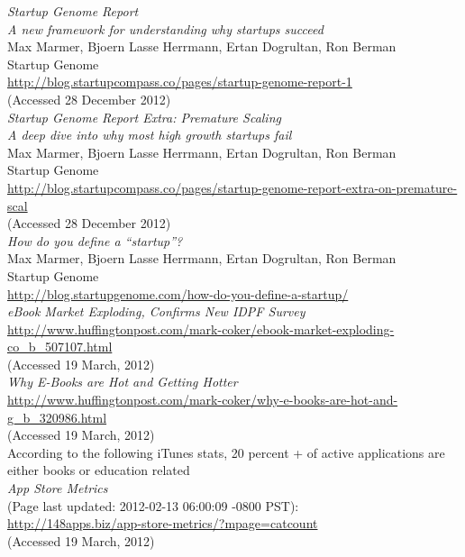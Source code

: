 \documentclass[a4paper,10pt]{article}
\begin{document}
\begin{thebibliography}{9}
  
 
 
  \emph{Startup Genome Report\\
	A new framework for understanding why startups succeed}\\
    Max Marmer, Bjoern Lasse Herrmann, Ertan Dogrultan, Ron Berman\\
    Startup Genome\\
  \url{http://blog.startupcompass.co/pages/startup-genome-report-1}\\
  (Accessed 28 December 2012)\\

  \emph{Startup Genome Report Extra: Premature Scaling\\
	A deep dive into why most high growth startups fail}\\
    Max Marmer, Bjoern Lasse Herrmann, Ertan Dogrultan, Ron Berman\\
    Startup Genome\\
  \url{http://blog.startupcompass.co/pages/startup-genome-report-extra-on-premature-scal}\\
  (Accessed 28 December 2012)\\

  
  \emph{How do you define a “startup”?}\\
    Max Marmer, Bjoern Lasse Herrmann, Ertan Dogrultan, Ron Berman\\
    Startup Genome\\
  \url{http://blog.startupgenome.com/how-do-you-define-a-startup/}\\

  
   \emph{eBook Market Exploding, Confirms New IDPF Survey}\\
   \url{http://www.huffingtonpost.com/mark-coker/ebook-market-exploding-co_b_507107.html}\\
  (Accessed 19 March, 2012)\\

   \emph{Why E-Books are Hot and Getting Hotter}\\
  \url{http://www.huffingtonpost.com/mark-coker/why-e-books-are-hot-and-g_b_320986.html}\\
 (Accessed 19 March, 2012)\\

   According to the following iTunes stats, 20 percent + of active applications are either books or education related \\
   \emph{App Store Metrics}\\
   (Page last updated: 2012-02-13 06:00:09 -0800 PST): \\
   \url{http://148apps.biz/app-store-metrics/?mpage=catcount} \\
  (Accessed 19 March, 2012)\\
 

\end{thebibliography}
\end{document}
